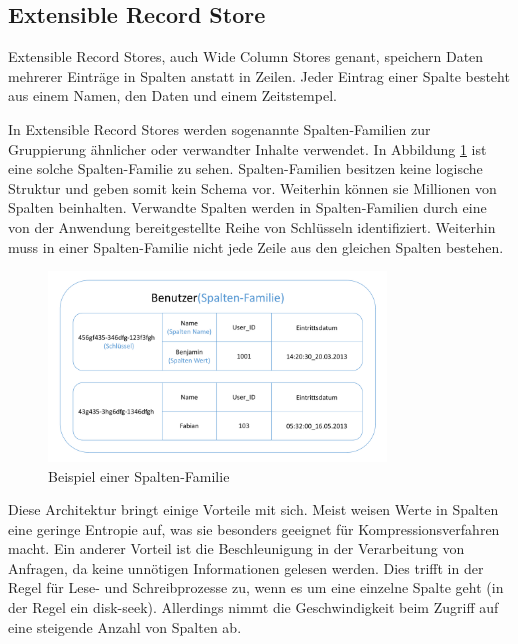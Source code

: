 \subsection{Extensible Record Store}
\label{ch:grundlagen:sec:NoSQL:ExtensibleRecordStore}

Extensible Record Stores, auch Wide Column Stores genant, speichern Daten mehrerer Einträge in Spalten anstatt in Zeilen. Jeder Eintrag einer Spalte besteht aus einem Namen, den Daten und einem Zeitstempel.

In Extensible Record Stores werden sogenannte Spalten-Familien zur Gruppierung ähnlicher oder verwandter Inhalte verwendet. In Abbildung \ref{wide_column_store} ist eine solche Spalten-Familie zu sehen. Spalten-Familien besitzen keine logische Struktur und geben somit kein Schema vor. Weiterhin können sie Millionen von Spalten beinhalten. Verwandte Spalten werden in Spalten-Familien durch eine von der Anwendung bereitgestellte Reihe von Schlüsseln identifiziert. Weiterhin muss in einer Spalten-Familie nicht jede Zeile aus den gleichen Spalten bestehen.

\begin{figure}[htbp]
	\centering
  \includegraphics[width=0.8\textwidth, width=0.8\textwidth]{pics/wide_column_stores.pdf}
	\caption{Beispiel einer Spalten-Familie}
	\label{wide_column_store}
\end{figure}

Diese Architektur bringt einige Vorteile mit sich. Meist weisen Werte in Spalten eine geringe Entropie auf, was sie besonders geeignet für Kompressionsverfahren macht. Ein anderer Vorteil ist die Beschleunigung in der Verarbeitung von Anfragen, da keine unnötigen Informationen gelesen werden. Dies trifft in der Regel für Lese- und Schreibprozesse zu, wenn es um eine einzelne Spalte geht (in der Regel ein disk-seek). Allerdings nimmt die Geschwindigkeit beim Zugriff auf eine steigende Anzahl von Spalten ab.

